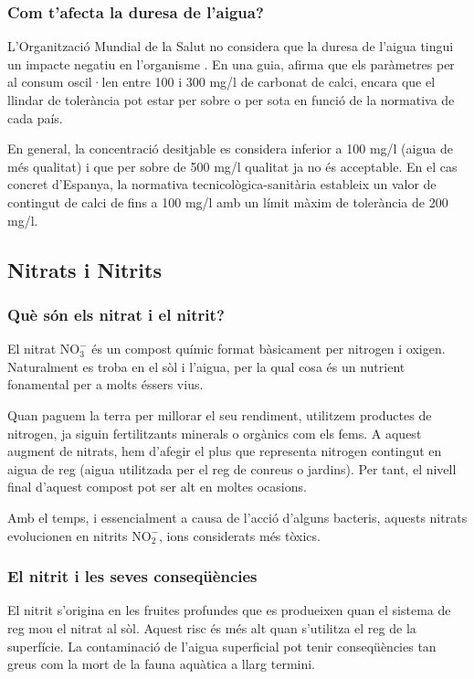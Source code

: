 \subsubsection{Com t’afecta la duresa de l’aigua?}
L'Organització Mundial de la Salut no considera que la duresa de l'aigua tingui un impacte negatiu en l'organisme . En una guia, afirma que els paràmetres per al consum oscil·len entre 100 i 300 mg/l de carbonat de calci, encara que el llindar de tolerància pot estar per sobre o per sota en funció de la normativa de cada país. \cite{Brita}

En general, la concentració desitjable es considera inferior a 100 mg/l (aigua de més qualitat) i que per sobre de 500 mg/l qualitat ja no és acceptable. En el cas concret d'Espanya, la normativa tecnicològica-sanitària estableix un valor de contingut de calci de fins a 100 mg/l amb un límit màxim de tolerància de 200 mg/l. \cite{Brita}
\subsection{Nitrats i Nitrits} \label{subsec:nitratsnitrits}
\subsubsection{Què són els nitrat i el nitrit?}
El nitrat \(\mathrm{NO_3^-}\) és un compost químic format bàsicament per nitrogen i oxigen. Naturalment es troba en el sòl i l'aigua, per la qual cosa és un nutrient fonamental per a molts éssers vius.

Quan paguem la terra per millorar el seu rendiment, utilitzem productes de nitrogen, ja siguin fertilitzants minerals o orgànics com els fems. A aquest augment de nitrats, hem d'afegir el plus que representa nitrogen contingut en aigua de reg (aigua utilitzada per el reg de conreus o jardins). Per tant, el nivell final d'aquest compost pot ser alt en moltes ocasions.

Amb el temps, i essencialment a causa de l'acció d'alguns bacteris, aquests nitrats evolucionen en nitrits \(\mathrm{NO_2^-}\), ions considerats més tòxics.
\subsubsection{El nitrit i les seves conseqüències}
El nitrit s'origina en les fruites profundes que es produeixen quan el sistema de reg mou el nitrat al sòl. Aquest risc és més alt quan s'utilitza el reg de la superfície. La contaminació de l'aigua superficial pot tenir conseqüències tan greus com la mort de la fauna aquàtica a llarg termini.

